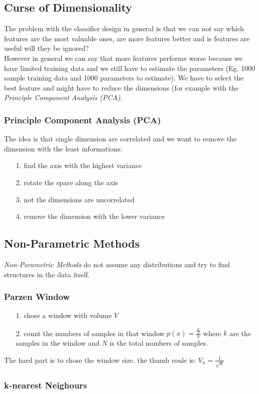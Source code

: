 \subsection{Curse of Dimensionality}
\label{ssect:curse-of-dimensionality}
The problem with the classifier design in general is that we can not say which features are the most valuable ones, are more features better and is features are useful will they be ignored? \\
However in general we can say that more features performe worse because we have limited training data and we still have to estimate the parameters (Eg. 1000 sample training data and 1000 parameters to estimate). We have to select the best feature and might have to reduce the dimensions (for example with the \textit{Principle Component Analysis (PCA)}.

\subsubsection{Principle Component Analysis (PCA)}
\label{sssect:principle-component-analysis-pca}
The idea is that single dimension are correlated and we want to remove the dimension with the least informations:
\begin{itemize}
	\item[1.] find the axis with the highest variance
	\item[2.] rotate the space along the axis
	\item[3.] not the dimensions are uncorrelated
	\item[4.] remove the dimension with the lower variance
\end{itemize}

\subsection{Non-Parametric Methods}
\label{ssect:non-parametric-methods}
\textit{Non-Parametric Methods} do not assume any distributions and try to find structures in the data itself.

\subsubsection{Parzen Window}
\label{sssect:parzen-window}
\begin{itemize}
	\item[1.] chose a window with volume $V$
	\item[2.] count the numbers of samples in that window $p(x) = \frac{\frac{k}{N}}{V}$ where $k$ are the samples in the window and $N$ is the total numbers of samples.
\end{itemize}
The hard part is to chose the window size. the thumb roule is: $V_n = \frac{1}{\sqrt{n}}$

\subsubsection{k-nearest Neighours}
\label{sssect:k-nearest-neighbours}



\newpage